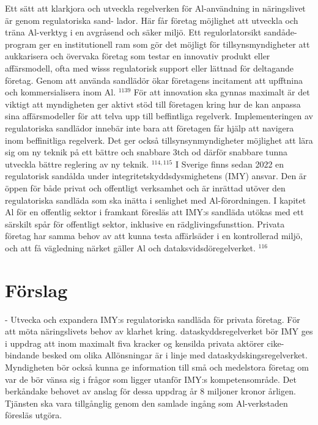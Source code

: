 {{{{{{{{{{{{{{Ett sätt att klarkjora och utveckla regelverken för Al-användning in näringslivet är genom regulatoriska sand- lador. Här får företag möjlighet att utveckla och träna Al-verktyg i en avgråsend och säker miljö. Ett regulorlatorsikt sandåde-program ger en institutionell ram som gör det möjligt för tillsynsmyndigheter att aukkarisera och övervaka företag som testar en innovativ produkt eller affärsmodell, ofta med wisss regulatorisk support eller lättnad för deltagande företag. Genom att använda sandlädör ökar företagens incitament att upfftnina och kommersialisera inom Al. \({ }^{1139}\) För att innovation ska gynnas maximalt är det viktigt att myndigheten ger aktivt stöd till företagen kring hur de kan anpassa sina affärsmodeller för att telva upp till beffintliga regelverk. Implementeringen av regulatoriska sandlädor innebär inte bara att företagen får hjälp att navigera inom beffinitliga regelverk. Det ger också tillsynsynmyndigheter möjlighet att lära sig om ny teknik på ett bättre och snabbare 3tch od därför snabbare tunna utveckla bättre reglering av ny teknik. \({ }^{114,115}\)
I Sverige finns sedan 2022 en regulatorisk sandålda under integritetskyddsdysmighetens (IMY) ansvar. Den är öppen för både privat och offentligt verksamhet och är inrättad utöver den regulatoriska sandläda som ska inätta i senlighet med Al-förordningen. I kapitet Al för en offentlig sektor i framkant föresläs att IMY:s sandläda utökas med ett särskilt spår för offentligt sektor, inklusive en rädglivingsfunsttion. Privata företag har samma behov av att kunna testa affärlsäder i en kontrollerad miljö, och att få vägledning närket gäller Al och dataksvidsdöregelverket. \(^{116}\)
\section*{Förslag}
- Utvecka och expandera IMY:s regulatoriska sandläda för privata företag. För att möta näringslivets behov av klarhet kring. dataskyddsregelverket bör IMY ges i uppdrag att inom maximalt fiva kracker og kensilda privata aktörer cike-bindande besked om olika Allönsningar är i linje med dataskydskingsregelverket. Myndigheten bör också kunna ge information till små och medelstora företag om var de bör vänsa sig i frågor som ligger utanför IMY:s kompetensområde. Det berkåndake behovet av anslag för dessa uppdrag år 8 miljoner kronor årligen. Tjänsten ska vara tillgånglig genom den samlade ingång som Al-verkstaden föresläs utgöra.

}}}}}}}}}}}}}}
